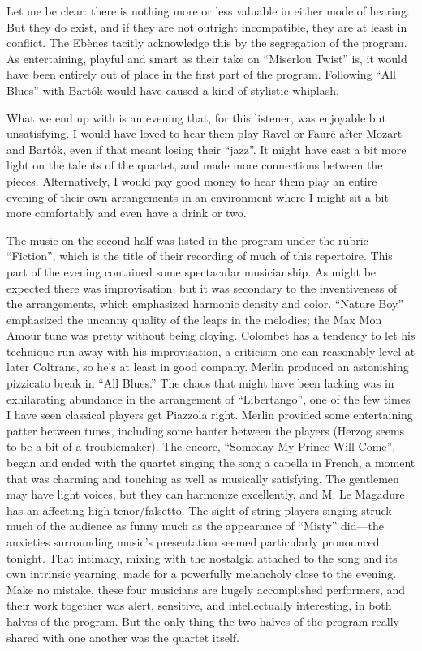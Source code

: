 Let me be clear: there is nothing more or less valuable in either mode of hearing. But they do exist, and if they are not outright incompatible, they are at least in conflict. The Ebènes tacitly acknowledge this by the segregation of the program. As entertaining, playful and smart as their take on “Miserlou Twist” is, it would have been entirely out of place in the first part of the program. Following “All Blues” with Bartók would have caused a kind of stylistic whiplash.

What we end up with is an evening that, for this listener, was enjoyable but unsatisfying. I would have loved to hear them play Ravel or Fauré after Mozart and Bartók, even if that meant losing their “jazz”. It might have cast a bit more light on the talents of the quartet, and made more connections between the pieces. Alternatively, I would pay good money to hear them play an entire evening of their own arrangements in an environment where I might sit a bit more comfortably and even have a drink or two.

The music on the second half was listed in the program under the rubric “Fiction”, which is the title of their recording of much of this repertoire. This part of the evening contained some spectacular musicianship. As might be expected there was improvisation, but it was secondary to the inventiveness of the arrangements, which emphasized harmonic density and color. “Nature Boy” emphasized the uncanny quality of the leaps in the melodies; the Max Mon Amour tune was pretty without being cloying. Colombet has a tendency to let his technique run away with his improvisation, a criticism one can reasonably level at later Coltrane, so he’s at least in good company. Merlin produced an astonishing pizzicato break in “All Blues.” The chaos that might have been lacking was in exhilarating abundance in the arrangement of “Libertango”, one of the few times I have seen classical players get Piazzola right. Merlin provided some entertaining patter between tunes, including some banter between the players (Herzog seems to be a bit of a troublemaker). The encore, “Someday My Prince Will Come”, began and ended with the quartet singing the song a capella in French, a moment that was charming and touching as well as musically satisfying. The gentlemen may have light voices, but they can harmonize excellently, and M. Le Magadure has an affecting high tenor/falsetto. The sight of string players singing struck much of the audience as funny much as the appearance of “Misty” did—the anxieties surrounding music’s presentation seemed particularly pronounced tonight. That intimacy, mixing with the nostalgia attached to the song and its own intrinsic yearning, made for a powerfully melancholy close to the evening. Make no mistake, these four musicians are hugely accomplished performers, and their work together was alert, sensitive, and intellectually interesting, in both halves of the program. But the only thing the two halves of the program really shared with one another was the quartet itself.